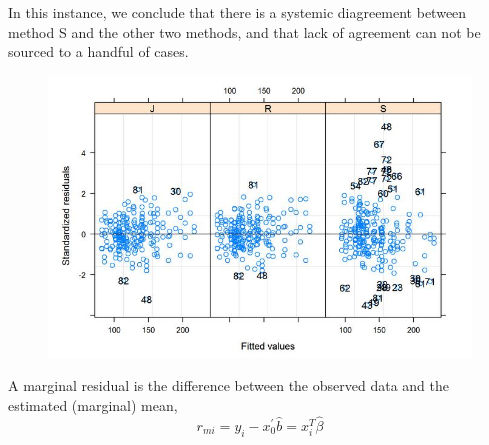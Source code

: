 \documentclass[12pt, a4paper]{report}
\theoremstyle{plain}
\theoremstyle{definition}
\theoremstyle{remark}
\begin{document}
	In this instance, we conclude that there is a systemic diagreement between method S and the other two methods, and that lack of agreement can not be sourced to a handful of cases.
	\begin{figure}[h!]
		\centering
		\includegraphics[width=0.7\linewidth]{images/bloodnlmeResidPlot2B}
	\end{figure}
	
	
	
	
	
	
	
	
	
	
	
	
	
	
	
	
	
	
	
	
	A marginal residual is the difference between the observed data and the estimated (marginal) mean, 
	\[r_{mi} = y_i - x_0^{\prime} \hat{b} =x^{T}_{i}\hat{\beta}\]
	
\end{document}

